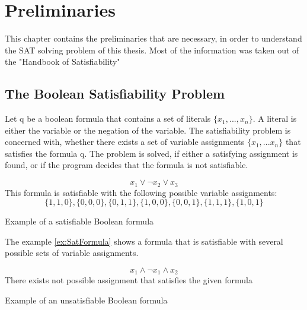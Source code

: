 
\chapter{Preliminaries}
\label{ch:Preliminaries}

This chapter contains the preliminaries that are necessary, in order to understand the SAT solving problem of this thesis. Most of the information was taken out of the "Handbook of Satisfiability" \cite{biere2009handbook}

\section{The Boolean Satisfiability Problem}
Let q be a boolean formula that contains a set of literals $\{x_1,...,x_n\}$. A literal is either the variable or the negation of the variable. The satisfiability problem is concerned with, whether there exists a set of variable assignments $\{x_1,...x_n\}$ that satisfies the formula q. The problem is solved, if either a satisfying assignment is found, or if the program decides that the formula is not satisfiable. \cite{biere2009handbook}

\begin{example}
\begin{leftbar}
\begin{displaymath}
x_1 \vee \neg x_2 \vee x_3
\end{displaymath}
This formula is satisfiable with the following possible variable assignments:
\begin{displaymath}
\{1,1,0\},\{0,0,0\},\{0,1,1\},\{1,0,0\},\{0,0,1\},\{1,1,1\},\{1,0,1\}
\end{displaymath}
\end{leftbar}
\caption{Example of a satisfiable Boolean formula}
\label{ex:SatFormula}
\end{example}

The example \ref{ex:SatFormula} shows a formula that is satisfiable with several possible sets of variable assignments.

\begin{example}
\begin{leftbar}
\begin{displaymath}
x_1 \wedge \neg x_1 \wedge x_2
\end{displaymath}
There exists not possible assignment that satisfies the given formula
\end{leftbar}
\caption{Example of an unsatisfiable Boolean formula}
\label{ex:UnsatFormula}
\end{example}

